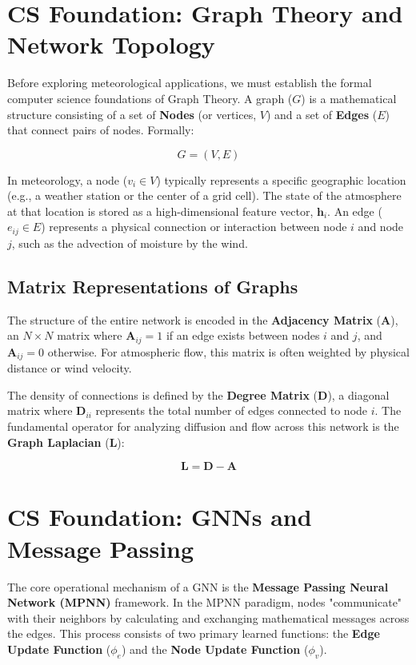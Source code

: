 \section{CS Foundation: Graph Theory and Network Topology}

Before exploring meteorological applications, we must establish the formal computer science foundations of Graph Theory. A graph ($G$) is a mathematical structure consisting of a set of \textbf{Nodes} (or vertices, $V$) and a set of \textbf{Edges} ($E$) that connect pairs of nodes. Formally:

\begin{equation}
G = (V, E)
\end{equation}

In meteorology, a node ($v_i \in V$) typically represents a specific geographic location (e.g., a weather station or the center of a grid cell). The state of the atmosphere at that location is stored as a high-dimensional feature vector, $\mathbf{h}_i$. An edge ($e_{ij} \in E$) represents a physical connection or interaction between node $i$ and node $j$, such as the advection of moisture by the wind. 

\subsection{Matrix Representations of Graphs}
The structure of the entire network is encoded in the \textbf{Adjacency Matrix} ($\mathbf{A}$), an $N \times N$ matrix where $\mathbf{A}_{ij} = 1$ if an edge exists between nodes $i$ and $j$, and $\mathbf{A}_{ij} = 0$ otherwise. For atmospheric flow, this matrix is often weighted by physical distance or wind velocity.

The density of connections is defined by the \textbf{Degree Matrix} ($\mathbf{D}$), a diagonal matrix where $\mathbf{D}_{ii}$ represents the total number of edges connected to node $i$. The fundamental operator for analyzing diffusion and flow across this network is the \textbf{Graph Laplacian} ($\mathbf{L}$):

\begin{equation}
\mathbf{L} = \mathbf{D} - \mathbf{A}
\end{equation}

\section{CS Foundation: GNNs and Message Passing}

The core operational mechanism of a GNN is the \textbf{Message Passing Neural Network (MPNN)} framework. In the MPNN paradigm, nodes "communicate" with their neighbors by calculating and exchanging mathematical messages across the edges. This process consists of two primary learned functions: the \textbf{Edge Update Function} ($\phi_e$) and the \textbf{Node Update Function} ($\phi_v$).

